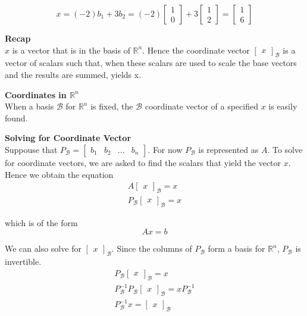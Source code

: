 \documentclass{article}
\begin{document}
  \[
    x=(-2)b_1+3b_2=(-2)\begin{bmatrix}
      1\\
      0
    \end{bmatrix}+3\begin{bmatrix}
      1\\
      2
    \end{bmatrix}=\boxed{\begin{bmatrix}
      1\\
      6
  \end{bmatrix}}
  \]

  \textbf{Recap}\\
  $ x $ is a vector that is in the basis of $ \mathbb{R}^{n} $. Hence the coordinate vector $ \begin{bmatrix}
    x
  \end{bmatrix}_\mathcal{B} $ is a vector of scalars such that, when these scalars are used to scale the base vectors and the results are summed, yields x. 

  \textbf{Coordinates in $ \mathbb{R}^{n} $}\\
  When a basis $ \mathcal{B} $ for $ \mathbb{R}^{n} $ is fixed, the $ \mathcal{B} $ coordinate vector of a specified $ x $ is easily found.

  \textbf{Solving for Coordinate Vector}\\
  Suppouse that $ P_\mathcal{B} = \begin{bmatrix}
    b_1 &b_2 &... &b_n
  \end{bmatrix} $. For now $ P_\mathcal{B} $ is represented as $ A $. To solve for coordinate vectors, we are asked to find the scalars that yield the vector $ x $. Hence we obtain the equation
  \[
    \begin{gathered}
    A\begin{bmatrix}
      x
    \end{bmatrix}_\mathcal{B}=x\\
    P_\mathcal{B}\begin{bmatrix}
      x
    \end{bmatrix}_\mathcal{B}=x
    \end{gathered}
  \]

  which is of the form
  \[
    Ax=b
  \]

  We can also solve for $ \begin{bmatrix}
    x
  \end{bmatrix}_\mathcal{B} $. Since the columns of $ P_\mathcal{B} $ form a basis for $ \mathbb{R}^{n} $, $ P_\mathcal{B} $ is invertible.  
  \[
    \begin{gathered}
    P_\mathcal{B}\begin{bmatrix}
      x
    \end{bmatrix}_\mathcal{B}=x\\
    P^{-1}_\mathcal{B}P_\mathcal{B}\begin{bmatrix}
      x
    \end{bmatrix}_\mathcal{B}=xP^{-1}_\mathcal{B}\\
    P^{-1}_\mathcal{B}x=\begin{bmatrix}
      x
    \end{bmatrix}_\mathcal{B} 
    \end{gathered}
  \]
\end{document}
